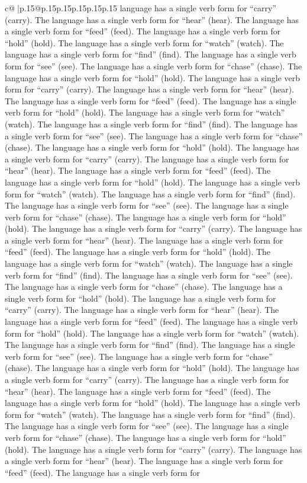 \documentclass{article}
\begin{document}
{\begin{supertabular}{c@{$\;$}|p{.15\linewidth}@{}p{.15\linewidth}p{.15\linewidth}p{.15\linewidth}p{.15\linewidth}p{.15\linewidth}}
{{{language has a single verb form for “carry” (carry). The language has a single verb form for “hear” (hear). The language has a single verb form for “feed” (feed). The language has a single verb form for “hold” (hold). The language has a single verb form for “watch” (watch). The language has a single verb form for “find” (find). The language has a single verb form for “see” (see). The language has a single verb form for “chase” (chase). The language has a single verb form for “hold” (hold). The language has a single verb form for “carry” (carry). The language has a single verb form for “hear” (hear). The language has a single verb form for “feed” (feed). The language has a single verb form for “hold” (hold). The language has a single verb form for “watch” (watch). The language has a single verb form for “find” (find). The language has a single verb form for “see” (see). The language has a single verb form for “chase” (chase). The language has a single verb form for “hold” (hold). The language has a single verb form for “carry” (carry). The language has a single verb form for “hear” (hear). The language has a single verb form for “feed” (feed). The language has a single verb form for “hold” (hold). The language has a single verb form for “watch” (watch). The language has a single verb form for “find” (find). The language has a single verb form for “see” (see). The language has a single verb form for “chase” (chase). The language has a single verb form for “hold” (hold). The language has a single verb form for “carry” (carry). The language has a single verb form for “hear” (hear). The language has a single verb form for “feed” (feed). The language has a single verb form for “hold” (hold). The language has a single verb form for “watch” (watch). The language has a single verb form for “find” (find). The language has a single verb form for “see” (see). The language has a single verb form for “chase” (chase). The language has a single verb form for “hold” (hold). The language has a single verb form for “carry” (carry). The language has a single verb form for “hear” (hear). The language has a single verb form for “feed” (feed). The language has a single verb form for “hold” (hold). The language has a single verb form for “watch” (watch). The language has a single verb form for “find” (find). The language has a single verb form for “see” (see). The language has a single verb form for “chase” (chase). The language has a single verb form for “hold” (hold). The language has a single verb form for “carry” (carry). The language has a single verb form for “hear” (hear). The language has a single verb form for “feed” (feed). The language has a single verb form for “hold” (hold). The language has a single verb form for “watch” (watch). The language has a single verb form for “find” (find). The language has a single verb form for “see” (see). The language has a single verb form for “chase” (chase). The language has a single verb form for “hold” (hold). The language has a single verb form for “carry” (carry). The language has a single verb form for “hear” (hear). The language has a single verb form for “feed” (feed). The language has a single verb form for }}}
\end{supertabular}}
\end{document}
